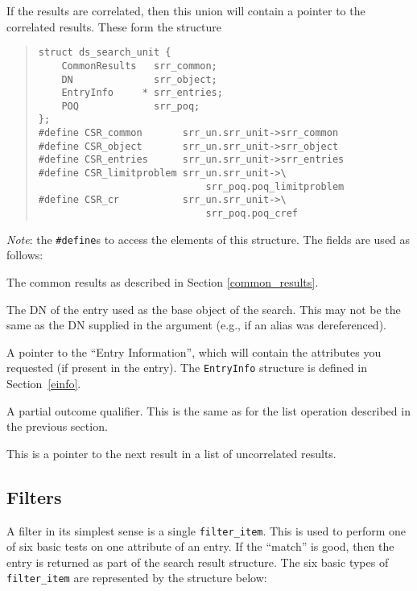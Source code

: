 \begin{describe}
If the results are correlated, then this union will
contain a pointer to the correlated results.  These form the structure
\begin{quote}\small\begin{verbatim}
struct ds_search_unit {
    CommonResults   srr_common;
    DN              srr_object;
    EntryInfo     * srr_entries;
    POQ             srr_poq;    
};
#define CSR_common       srr_un.srr_unit->srr_common
#define CSR_object       srr_un.srr_unit->srr_object
#define CSR_entries      srr_un.srr_unit->srr_entries
#define CSR_limitproblem srr_un.srr_unit->\
                             srr_poq.poq_limitproblem
#define CSR_cr           srr_un.srr_unit->\
                             srr_poq.poq_cref
\end{verbatim}\end{quote}
{\em Note}: the \verb"#define"s to access the elements of this structure.
The fields are used as follows:
\begin{describe}
\item [\verb"srr\_common":] The common results as described in Section
\ref{common_results}.
\item [\verb"srr\_object":] The DN of the entry used as the base object of
the search.  This may not be the same as the DN supplied in the argument (e.g.,
if an alias was dereferenced).
\item [\verb"srr\_entries":] A pointer to the ``Entry Information'',
which will contain the
attributes you requested (if present in the entry). 
The \verb+EntryInfo+ structure is defined in Section~\ref{einfo}.
\item [\verb"srr\_poq":] A partial outcome qualifier.  This is the
same as for the list operation described in the previous section.
\end{describe}

\item [\verb"srr\_next":] This is a pointer to the next 
result in a list of uncorrelated results.
\end{describe}

\subsection {Filters}
\label{filters}

A filter in its simplest sense is a single \verb"filter_item".  This is
used to perform one of six basic tests on one attribute of an entry.
If the ``match'' is good, then the entry is returned as part of
the search result structure.
The six basic types of \verb"filter_item"
are represented by the structure below:

